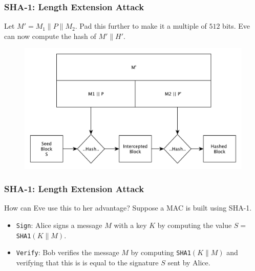 \documentclass{beamer}
\newcommand{\<}{\langle}
\renewcommand{\>}{\rangle}
\begin{document}
\begin{frame}
\frametitle{SHA-1: Length Extension Attack}

Let $M' = M_1 \| P \| M_2$. Pad this further to make it a multiple of $512$ bits. Eve can now compute the hash of $M'\| H'$.
\begin{figure}
\includegraphics[scale=.5]{IMG/lenghtextattack}
\end{figure}
\end{frame}

\begin{frame}[fragile]
\frametitle{SHA-1: Length Extension Attack}

How can Eve use this to her advantage? Suppose a MAC is built using SHA-1.
\begin{itemize}
\item \verb|Sign|: Alice signs a message $M$ with a key $K$ by computing the value $S=$ \verb|SHA1|$(K\| M)$.
\item \verb|Verify|: Bob verifies the message $M$ by computing \verb|SHA1|$(K \|M)$ and verifying that this is is equal to the signature $S$ sent by Alice.
\end{itemize}
\end{frame}
\end{document}
